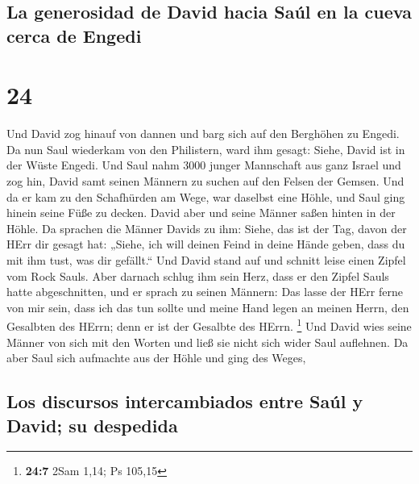 \hypertarget{la-generosidad-de-david-hacia-sauxfal-en-la-cueva-cerca-de-engedi}{%
\subsection{La generosidad de David hacia Saúl en la cueva cerca de
Engedi}\label{la-generosidad-de-david-hacia-sauxfal-en-la-cueva-cerca-de-engedi}}

\hypertarget{section-23}{%
\section{24}\label{section-23}}

 Und David zog hinauf von dannen und barg sich auf den
Berghöhen zu Engedi.  Da nun Saul wiederkam von den
Philistern, ward ihm gesagt: Siehe, David ist in der Wüste Engedi.
 Und Saul nahm 3000 junger Mannschaft aus ganz Israel und
zog hin, David samt seinen Männern zu suchen auf den Felsen der Gemsen.
 Und da er kam zu den Schafhürden am Wege, war daselbst
eine Höhle, und Saul ging hinein seine Füße zu decken. David aber und
seine Männer saßen hinten in der Höhle.  Da sprachen die
Männer Davids zu ihm: Siehe, das ist der Tag, davon der HErr dir gesagt
hat: „Siehe, ich will deinen Feind in deine Hände geben, dass du mit ihm
tust, was dir gefällt.`` Und David stand auf und schnitt leise einen
Zipfel vom Rock Sauls.  Aber darnach schlug ihm sein Herz,
dass er den Zipfel Sauls hatte abgeschnitten,  und er
sprach zu seinen Männern: Das lasse der HErr ferne von mir sein, dass
ich das tun sollte und meine Hand legen an meinen Herrn, den Gesalbten
des HErrn; denn er ist der Gesalbte des HErrn. \footnote{\textbf{24:7}
  2Sam 1,14; Ps 105,15}  Und David wies seine Männer von
sich mit den Worten und ließ sie nicht sich wider Saul auflehnen. Da
aber Saul sich aufmachte aus der Höhle und ging des Weges,

\hypertarget{los-discursos-intercambiados-entre-sauxfal-y-david-su-despedida}{%
\subsection{Los discursos intercambiados entre Saúl y David; su
despedida}\label{los-discursos-intercambiados-entre-sauxfal-y-david-su-despedida}}

